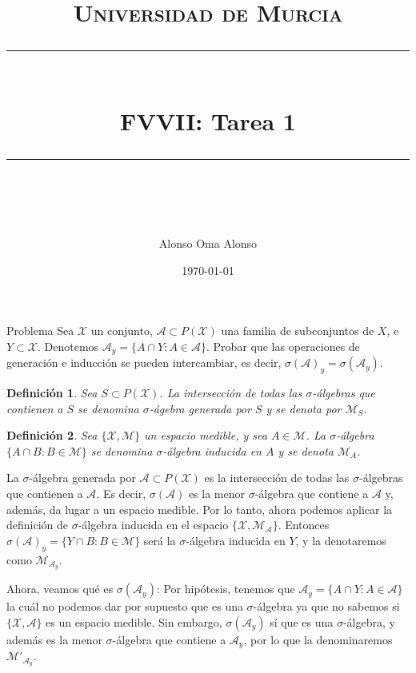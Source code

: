 \documentclass{article}
\title{	

	\normalfont\normalsize
	\textsc{Universidad de Murcia}\\ 
	\vspace{25pt} %
	\rule{\linewidth}{0.5pt} %
	\vspace{20pt}\\ %
	{\huge FVVII: Tarea 1
}\\ %
	\vspace{12pt} %
	\rule{\linewidth}{2pt}\\ %
	\vspace{12pt} %
}
\author{\LARGE Alonso Oma Alonso} %
\date{\normalsize\today} %
\newtheorem{definition}{Definición}[section]
\begin{document}
\begin{titlepage}
	\maketitle
\end{titlepage}

\newpage
\tableofcontents
\newpage

\begin{section}{Problema}
	Sea $\mathcal{X}$ un conjunto, $\mathcal{A}  \subset P(\mathcal{X})$ una familia de subconjuntos de $X
$, e $Y \subset \mathcal{X}$. Denotemos $\mathcal{A}_y = \{A \cap Y: A \in \mathcal{A}\}$. Probar que las operaciones de generación e inducción se pueden intercambiar, es decir, $\sigma(\mathcal{A})_y = \sigma(\mathcal{A}_y)$.

\begin{definition}
	Sea $S \subset P(\mathcal{X})$. La intersección de todas las $\sigma$-álgebras que contienen a $S$ se denomina $\sigma$-ágebra generada por $S$ y se denota por $\mathcal{M}_S$.
\end{definition}

\begin{definition}
	Sea $\{\mathcal{X, \mathcal{M}}\}$ un espacio medible, y sea $A\in \mathcal{M}$. La $\sigma$-álgebra $\{A\cap B: B\in \mathcal{M}\}$ se denomina 
	$\sigma$-álgebra inducida en $A$ y se denota $\mathcal{M}_A$.
\end{definition}

La $\sigma$-álgebra generada por $\mathcal{A}\subset P(\mathcal{X})$ es la intersección de todas las $\sigma$-álgebras 
que contienen a $\mathcal{A}$. Es decir, $\sigma(\mathcal{A})$ es la menor $\sigma$-álgebra que contiene a $\mathcal{A}$ y, 
además, da lugar a un espacio medible. Por lo tanto, ahora podemos aplicar la definición de $\sigma$-álgebra inducida en el 
espacio $\{\mathcal{X}, \mathcal{M}_{\mathcal{A}}\}$. Entonces $\sigma(\mathcal{A})_y = \{Y\cap B: B \in \mathcal{M}\}$ será 
la $\sigma$-álgebra inducida en $Y$, y la denotaremos como $\mathcal{M}_{\mathcal{A}_y}$.

Ahora, veamos qué es $\sigma(\mathcal{A}_y)$: Por hipótesis, tenemos que $\mathcal{A}_y = \{A \cap Y: A \in \mathcal{A}\}$
la cuál no podemos dar por supuesto que es una $\sigma$-álgebra ya que no sabemos si $\{\mathcal{X}, \mathcal{A}\}$ es un 
espacio medible. Sin embargo, $\sigma(\mathcal{A}_y)$ sí que es una $\sigma$-álgebra, y además es la menor $\sigma$-álgebra 
que contiene a $\mathcal{A}_y$, por lo que la denominaremos $\mathcal{M'}_{\mathcal{A}_y}$.


\end{section}
\end{document}
